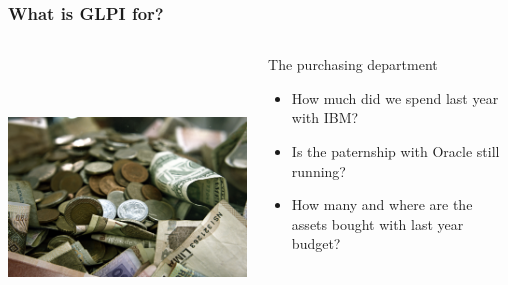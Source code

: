 \documentclass{beamer}
\begin{document}
\begin{frame}
    \frametitle{What is GLPI for?}

 \begin{columns}
 \begin{column}{0.35\textwidth}
         \includegraphics[height=7.5cm]{./pics/purchasing.jpg}
 \end{column}
 \begin{column}{0.65\textwidth}
    \begin{block}{The purchasing department}
        \begin{itemize}
            \item How much did we spend last year with IBM?
            \item Is the paternship with Oracle still running?
            \item How many and where are the assets bought with last year budget?
        \end{itemize}
    \end{block}
 \end{column}
\end{columns}



\end{frame}
\end{document}
